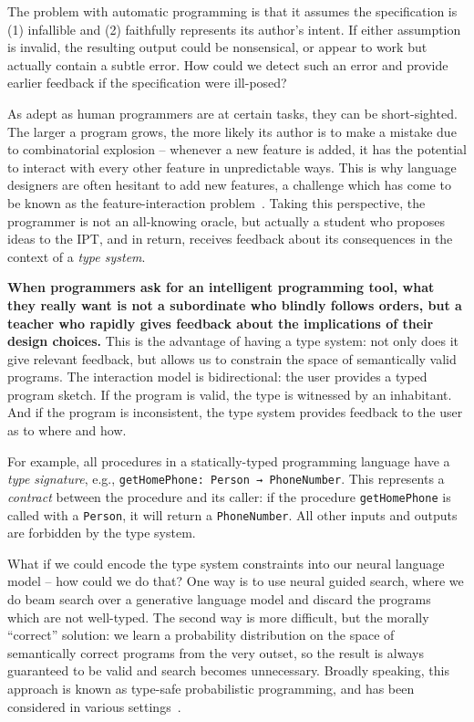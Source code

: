 \documentclass[12pt]{article}
\begin{document}
\noindent The problem with automatic programming is that it assumes the specification is (1) infallible and (2) faithfully represents its author's intent. If either assumption is invalid, the resulting output could be nonsensical, or appear to work but actually contain a subtle error. How could we detect such an error and provide earlier feedback if the specification were ill-posed?

As adept as human programmers are at certain tasks, they can be short-sighted. The larger a program grows, the more likely its author is to make a mistake due to combinatorial explosion -- whenever a new feature is added, it has the potential to interact with every other feature in unpredictable ways. This is why language designers are often hesitant to add new features, a challenge which has come to be known as the feature-interaction problem~\cite{apel2013exploring}. Taking this perspective, the programmer is not an all-knowing oracle, but actually a student who proposes ideas to the IPT, and in return, receives feedback about its consequences in the context of a \textit{type system}.

\textbf{When programmers ask for an intelligent programming tool, what they really want is not a subordinate who blindly follows orders, but a teacher who rapidly gives feedback about the implications of their design choices.} This is the advantage of having a type system: not only does it give relevant feedback, but allows us to constrain the space of semantically valid programs. The interaction model is bidirectional: the user provides a typed program sketch. If the program is valid, the type is witnessed by an inhabitant. And if the program is inconsistent, the type system provides feedback to the user as to where and how.

For example, all procedures in a statically-typed programming language have a \textit{type signature}, e.g., \texttt{getHomePhone: Person → PhoneNumber}. This represents a \textit{contract} between the procedure and its caller: if the procedure \texttt{getHomePhone} is called with a \texttt{Person}, it will return a \texttt{PhoneNumber}. All other inputs and outputs are forbidden by the type system.

What if we could encode the type system constraints into our neural language model -- how could we do that? One way is to use neural guided search, where we do beam search over a generative language model and discard the programs which are not well-typed. The second way is more difficult, but the morally ``correct'' solution: we learn a probability distribution on the space of semantically correct programs from the very outset, so the result is always guaranteed to be valid and search becomes unnecessary. Broadly speaking, this approach is known as type-safe probabilistic programming, and has been considered in various settings~\cite{murali2017bayesian}.
\end{document}

